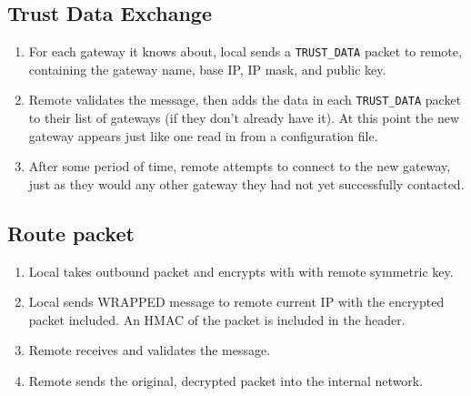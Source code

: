 \subsection{Trust Data Exchange}
\begin{enumerate}
	\item For each gateway it knows about, local sends a \texttt{TRUST\_DATA} packet to remote, containing the gateway name, base \ac{IP}, \ac{IP} mask, and public key.
	\item Remote validates the message, then adds the data in each \texttt{TRUST\_DATA} packet to their list of gateways (if they don't already have it). At this point the new gateway appears just like one read in from a configuration file.
	\item After some period of time, remote attempts to connect to the new gateway, just as they would any other gateway they had not yet successfully contacted.
 \end{enumerate}

\subsection{Route packet}
\label{sec:arg_protocol_route}
\begin{enumerate}
	\item Local takes outbound packet and encrypts with with remote symmetric key.
	\item Local sends WRAPPED message to remote current IP with the encrypted packet included. An \ac{HMAC} of the packet is included in the header.
	\item Remote receives and validates the message.
	\item Remote sends the original, decrypted packet into the internal network.
\end{enumerate}

